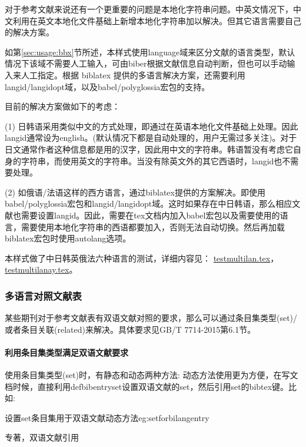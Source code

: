 对于参考文献来说还有一个更重要的问题是本地化字符串问题。中英文情况下，中文利用在英文本地化文件基础上新增本地化字符串加以解决。但其它语言需要自己的解决方案。

如第\ref{sec:usage:bbx}节所述，本样式使用language域来区分文献的语言类型，默认情况下该域不需要人工输入，可由biber根据文献信息自动判断，但也可以手动输入来人工指定。根据 biblatex 提供的多语言解决方案，还需要利用langid/langidopt域，以及babel/polyglossia宏包的支持。

目前的解决方案做如下的考虑：

(1) 日韩语采用类似中文的方式处理，即通过在英语本地化文件基础上处理。因此langid通常设为english。(默认情况下都是自动处理的，用户无需过多关注)。对于日文通常作者这种信息都是用的汉字，因此用中文的字符串。韩语暂没有考虑它自身的字符串，而使用英文的字符串。当没有除英文外的其它西语时，langid也不需要处理。

(2) 如俄语/法语这样的西方语言，通过biblatex提供的方案解决。即使用babel/polyglossia宏包和langid/langidopt域。这时如果存在中日韩语，那么相应文献也需要设置langid。因此，需要在tex文档内加入babel宏包以及需要使用的语言，需要使用本地化字符串的西语都要加入，否则无法自动切换。然后再加载biblatex宏包时使用autolang选项。

本样式做了中日韩英俄法六种语言的测试，详细内容见：
\href{run:example/testmultilan.tex}{testmultilan.tex}，
\href{run:example/testmultilanay.tex}{testmultilanay.tex}。


\subsubsection{多语言对照文献表}

某些期刊对于参考文献表有双语文献对照的要求，那么可以通过条目集类型(set)/或者条目关联(related)来解决。具体要求见GB/T 7714-2015第6.1节。

\paragraph{利用条目集类型满足双语文献要求}

使用条目集类型(set)时，有静态和动态两种方法:
动态方法使用更为方便，在写文档时候，直接利用defbibentryset设置双语文献的set，然后引用set的bibtex键。比如:
\begin{example}{设置set条目集用于双语文献动态方法}{eg:setforbilangentry}
\begin{texlist}
专著，双语文献引用\cite{bilangyi2013}
\end{texlist}
\end{example}

